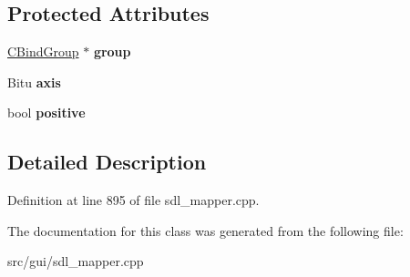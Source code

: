 \subsection*{Protected Attributes}
\begin{DoxyCompactItemize}
\item 
\hypertarget{classCJAxisBind_a3aeea9f221c5a76fdf0658d5df006cac}{\hyperlink{classCBindGroup}{C\-Bind\-Group} $\ast$ {\bfseries group}}\label{classCJAxisBind_a3aeea9f221c5a76fdf0658d5df006cac}

\item 
\hypertarget{classCJAxisBind_a1845e3060cbcb2180e5a907dda6a7d4c}{Bitu {\bfseries axis}}\label{classCJAxisBind_a1845e3060cbcb2180e5a907dda6a7d4c}

\item 
\hypertarget{classCJAxisBind_a5c25cb696106b0959274368cd8dae0bd}{bool {\bfseries positive}}\label{classCJAxisBind_a5c25cb696106b0959274368cd8dae0bd}

\end{DoxyCompactItemize}


\subsection{Detailed Description}


Definition at line 895 of file sdl\-\_\-mapper.\-cpp.



The documentation for this class was generated from the following file\-:\begin{DoxyCompactItemize}
\item 
src/gui/sdl\-\_\-mapper.\-cpp\end{DoxyCompactItemize}
